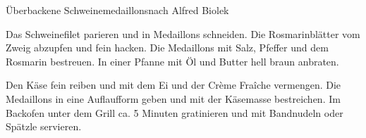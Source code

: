 \begin{recipe}{Überbackene Schweinemedaillons}{nach Alfred Biolek}
  \label{Schweinemedaillons}
  \inglist

  \steps
  Das Schweinefilet parieren und in Medaillons schneiden. Die Rosmarinblätter
  vom Zweig abzupfen und fein hacken. Die Medaillons mit Salz, Pfeffer und dem
  Rosmarin bestreuen. In einer Pfanne mit Öl und Butter hell braun anbraten.

  Den Käse fein reiben und mit dem Ei und der Crème Fraîche vermengen. Die
  Medaillons in eine Auflaufform geben und mit der Käsemasse bestreichen. Im
  Backofen unter dem Grill ca. 5 Minuten gratinieren und mit Bandnudeln oder
  Spätzle servieren.
\end{recipe}